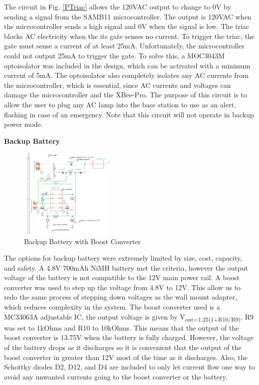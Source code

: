 \documentclass[journal,compsoc]{IEEEtran}
\begin{document}
The circuit in Fig. \ref{PTriac} allows the 120VAC output to change to 0V by sending a signal from the SAMB11 microcontroller.  The output is 120VAC when the microcontroller sends a high signal and 0V when the signal is low.  The triac blocks AC electricity when the its gate senses no current.  To trigger the triac, the gate must sense a current of at least 25mA.  Unfortunately, the microcontroller could not output 25mA to trigger the gate.  To solve this, a MOC3043M optoisolator was included in the design, which can be activated with a minimum current of 5mA.  The optoisolator also completely isolates any AC currents from the microcontroller, which is essential, since AC currents and voltages can damage the microcontroller and the XBee-Pro.  The purpose of this circuit is to allow the user to plug any AC lamp into the base station to use as an alert, flashing in case of an emergency.  Note that this circuit will not operate in backup power mode.


\textbf {Backup Battery}

\begin{figure}[ht]	%
\centering
\includegraphics[width=0.4\textwidth]{Boost.png}
\caption{Backup Battery with Boost Converter}
\label{Pboost}
\end{figure}

The options for backup battery were extremely limited by size, cost, capacity, and safety.  A 4.8V 700mAh NiMH battery met the criteria, however the output voltage of the battery is not compatible to the 12V main power rail. A boost converter was used to step up the voltage from 4.8V to 12V. This allow us to redo the same process of stepping down voltages as the wall mount adapter, which reduces complexity in the system. The boost converter used is a MC33063A adjustable IC, the output voltage is given by V\textsubscript{out=1.25(1+R10/R9)}. R9 was set to 1kOhms and R10 to 10kOhms. This means that the output of the boost converter is 13.75V when the battery is fully charged. However, the voltage of the battery drops as it discharges so it is convenient that the output of the boost converter in greater than 12V most of the time as it discharges. Also, the Schottky diodes D2, D12, and D4 are included to only let current flow one way to avoid any unwanted currents going to the boost converter or the battery. 
\end{document}
